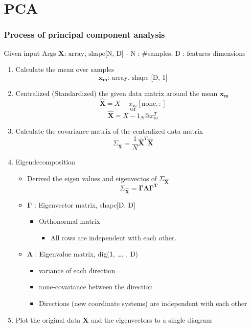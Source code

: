 \documentclass[11pt]{article}
\providecommand{\tightlist}{%
      \setlength{\itemsep}{0pt}\setlength{\parskip}{0pt}}
\begin{document}
    \hypertarget{pca}{%
\section{PCA}\label{pca}}

\hypertarget{process-of-principal-component-analysis}{%
\subsubsection{Process of principal component
analysis}\label{process-of-principal-component-analysis}}

Given input Args \(\mathbf{X} \text{: array, shape[N, D]}\) - N :
\#samples, D : features dimensions

\begin{enumerate}
\def\labelenumi{\arabic{enumi}.}
\item
  Calculate the mean over samples
  \[\mathbf{x_m} \text{: array, shape [D, 1]}\]
\item
  Centralized (Standardized) the given data matrix around the mean
  \(\mathbf{x_m}\) \[\hat{\mathbf{X}} = X - x_m[\text{none}, :]\]
  \[\text{or}\] \[\hat{\mathbf{X}} = X -  1_N@x_m^T\]
\item
  Calculate the covariance matrix of the centralized data matrix
  \[\Sigma_{\hat{\mathbf{X}}} = \frac{1}{N}\hat{\mathbf{X}}^T\hat{\mathbf{X}}\]
\item
  Eigendecomposition

  \begin{itemize}
  \item
    Derived the eigen values and eigenvectos of
    \(\Sigma_{\hat{\mathbf{X}}}\) \[
    \Sigma_{\hat{\mathbf{X}}} = \mathbf{\Gamma}\mathbf{\Lambda}\mathbf{\Gamma^T}
    \]
  \item
    \(\mathbf{\Gamma}\) : Eigenvector matrix, shape{[}D, D{]}

    \begin{itemize}
    \tightlist
    \item
      Orthonormal matrix

      \begin{itemize}
      \tightlist
      \item
        All rows are independent with each other.
      \end{itemize}
    \end{itemize}
  \item
    \(\mathbf{\Lambda}\) : Eigenvalue matrix, dig(1, \ldots. , D)

    \begin{itemize}
    \tightlist
    \item
      variance of each direction
    \item
      none-covariance between the direction
    \item
      Directions (new coordinate systems) are independent with each
      other
    \end{itemize}
  \end{itemize}
\item
  Plot the original data \(\mathbf{X}\) and the eigenvectors to a single
  diagram


\end{enumerate}
\end{document}
